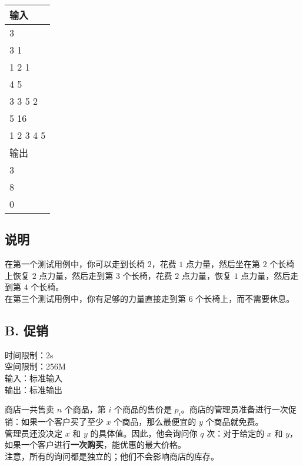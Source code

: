 \documentclass{article}
\begin{document}
\begin{CJK}{UTF8}{gbsn}
\begin{tabular}{|L{11.5cm}|}
\hline
输入\\
\hline
{} 3\\
 3 1\\
 1 2 1\\
 4 5\\
 3 3 5 2\\
 5 16\\
 1 2 3 4 5\\
\hline
输出\\
\hline
{} 3\\
 8\\
 0\\
\hline
\end{tabular}

\subsection*{说明}

在第一个测试用例中，你可以走到长椅 $2$，花费 $1$ 点力量，然后坐在第 $2$ 个长椅上恢复 $2$ 点力量，然后走到第 $3$ 个长椅，花费 $2$ 点力量，恢复 $1$ 点力量，然后走到第 $4$ 个长椅。\\

在第三个测试用例中，你有足够的力量直接走到第 $6$ 个长椅上，而不需要休息。

\newpage

\begin{center}
\section*{B. 促销}
时间限制：2s\\
空间限制：256M\\
输入：标准输入\\
输出：标准输出
\end{center}

商店一共售卖 $n$ 个商品，第 $i$ 个商品的售价是 $p_i$。商店的管理员准备进行一次促销：如果一个客户买了至少 $x$ 个商品，那么最便宜的 $y$ 个商品就免费。\\

管理员还没决定 $x$ 和 $y$ 的具体值。因此，他会询问你 $q$ 次：对于给定的 $x$ 和 $y$，如果一个客户进行\textbf{一次购买}，能优惠的最大价格。\\

注意，所有的询问都是独立的；他们不会影响商店的库存。


\end{CJK}
\end{document}
